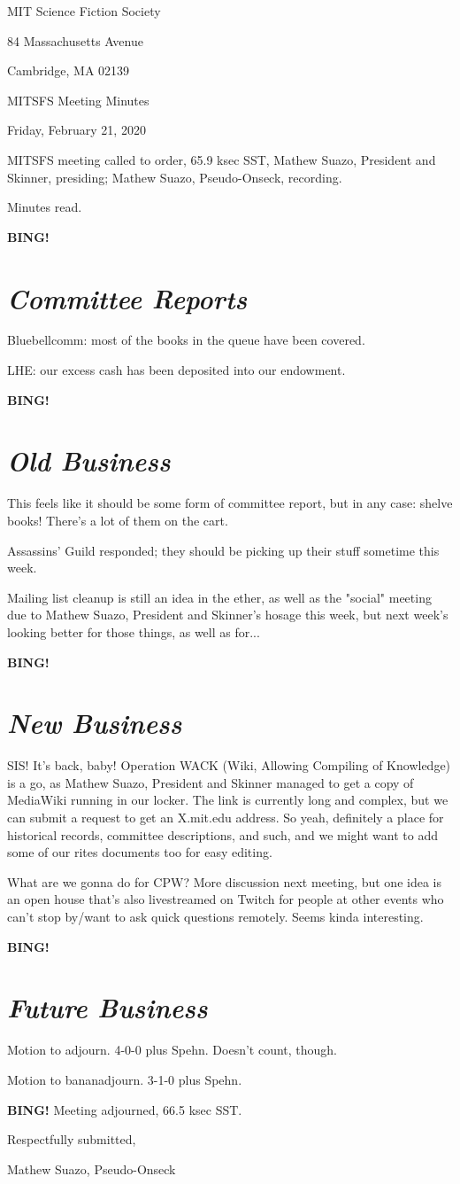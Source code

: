 \documentclass[10pt]{article}
\newcommand{\bing}{{\bf BING!} }
\newcommand{\goto}[1]{\bing \vskip 12pt \section*{{\em{#1}}}}
\newcommand{\ps}{ plus Spehn\xspace}
\newcommand{\skinner}{Mathew Suazo, President and Skinner\xspace}
\newcommand{\onseck}{Mathew Suazo, Pseudo-Onseck\xspace}
\newcommand{\meetingdate}{Friday, February 21, 2020}
\begin{document}
\begin{center}

MIT Science Fiction Society

84 Massachusetts Avenue

Cambridge, MA 02139

\vspace{12pt}

MITSFS Meeting Minutes

\meetingdate

\end{center}

\vspace{18pt}

\setlength{\parskip}{6pt}

\noindent
MITSFS meeting called to order, 65.9 ksec SST,
\skinner, presiding; \onseck, recording.

Minutes read.

\goto{Committee Reports}

Bluebellcomm: most of the books in the queue have been covered.

LHE: our excess cash has been deposited into our endowment.

\goto{Old Business}

This feels like it should be some form of committee report, but in any case: shelve books! There's a lot of them on the cart.

Assassins' Guild responded; they should be picking up their stuff sometime this week.

Mailing list cleanup is still an idea in the ether, as well as the "social" meeting due to \skinner's hosage this week, but next week's looking better for those things, as well as for...

\goto{New Business}

SIS! It's back, baby! Operation WACK (Wiki, Allowing Compiling of Knowledge) is a go, as \skinner managed to get a copy of MediaWiki running in our locker. The link is currently long and complex, but we can submit a request to get an X.mit.edu address. So yeah, definitely a place for historical records, committee descriptions, and such, and we might want to add some of our rites documents too for easy editing.

What are we gonna do for CPW? More discussion next meeting, but one idea is an open house that's also livestreamed on Twitch for people at other events who can't stop by/want to ask quick questions remotely. Seems kinda interesting.

\goto{Future Business}

Motion to adjourn. 4-0-0 \ps. Doesn't count, though.

Motion to bananadjourn. 3-1-0 \ps.

\bing
\noindent
Meeting adjourned, 66.5 ksec SST.

\vspace{18pt}

\centerline{Respectfully submitted,}
\centerline{\onseck}
\end{document}

